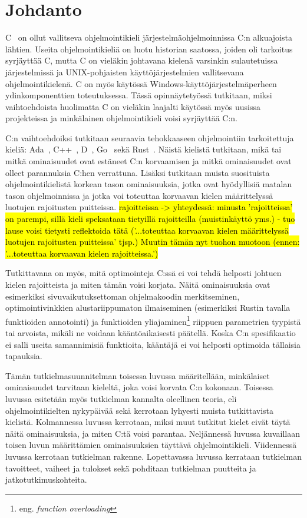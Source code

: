 \section{Johdanto} 

C~\citep{C11} on ollut vallitseva ohjelmointikieli järjestelmäohjelmoinnissa
C:n alkuajoista lähtien. Useita ohjelmointikieliä on luotu historian saatossa,
joiden oli tarkoitus syrjäyttää C, mutta C on vieläkin johtavana kielenä
varsinkin sulautetuissa järjestelmissä ja UNIX-pohjaisten käyttöjärjestelmien
vallitsevana ohjelmointikielenä. C on myös käytössä
Windows-käyttöjärjestelmäperheen ydinkomponenttien toteutuksessa. Tässä
opinnäytetyössä tutkitaan, miksi vaihtoehdoista huolimatta C on vieläkin
laajalti käytössä myös uusissa projekteissa ja minkälainen ohjelmointikieli
voisi syrjäyttää C:n.

C:n vaihtoehdoiksi tutkitaan seuraavia tehokkaaseen ohjelmointiin tarkoitettuja
kieliä: Ada~\citep{ADA12}, C++~\citep{CPP14}, D~\citep{D}, Go~\citep{golang}
sekä Rust~\citep{rust}. Näistä kielistä tutkitaan, mikä tai mitkä ominaisuudet
ovat estäneet C:n korvaamisen ja mitkä ominaisuudet ovat olleet parannuksia
C:hen verrattuna. Lisäksi tutkitaan muista suosituista ohjelmointikielistä
korkean tason ominaisuuksia, jotka ovat hyödyllisiä matalan tason
ohjelmoinnissa ja jotka voi toteuttaa korvaavan kielen määrittelyssä luotujen
rajoitusten puitteissa. \hl{rajoitteissa -> yhteydessä: minusta 'rajoitteissa'
on parempi, sillä kieli speksataan tietyillä rajoitteilla (muistinkäyttö yms.)
- tuo lause voisi tietysti reflektoida tätä ('...toteuttaa korvaavan kielen
määrittelyssä luotujen rajoitusten puitteissa' tjsp.) Muutin tämän nyt tuohon
muotoon (ennen: '...toteuttaa korvaavan kielen rajoitteissa.')}

Tutkittavana on myös, mitä optimointeja C:ssä ei voi tehdä helposti johtuen
kielen rajoitteista ja miten tämän voisi korjata. Näitä ominaisuuksia ovat
esimerkiksi sivuvaikutuksettoman ohjelmakoodin merkitseminen,
optimointivinkkien alustariippumaton ilmaiseminen (esimerkiksi Rustin tavalla
funktioiden annotointi) ja funktioiden yliajaminen\footnote{eng. \emph{function
overloading}} riippuen parametrien tyypistä tai arvoista, mikäli ne voidaan
kääntöaikaisesti päätellä. Koska C:n spesifikaatio ei salli useita samannimisiä
funktioita, kääntäjä ei voi helposti optimoida tällaisia tapauksia.

Tämän tutkielmasuunnitelman toisessa luvussa määritellään, minkälaiset
ominaisuudet tarvitaan kieleltä, joka voisi korvata C:n kokonaan. Toisessa
luvussa esitetään myös tutkielman kannalta oleellinen teoria, eli
ohjelmointikielten nykypäivää sekä kerrotaan lyhyesti muista tutkittavista
kielistä. Kolmannessa luvussa kerrotaan, miksi muut tutkitut kielet eivät täytä
näitä ominaisuuksia, ja miten C:tä voisi parantaa. Neljännessä luvussa
kuvaillaan toisen luvun määrittämien ominaisuuksien täyttävä ohjelmointikieli.
Viidennessä luvussa kerrotaan tutkielman rakenne. Lopettavassa luvussa
kerrataan tutkielman tavoitteet, vaiheet ja tulokset sekä pohditaan tutkielman
puutteita ja jatkotutkimuskohteita.
